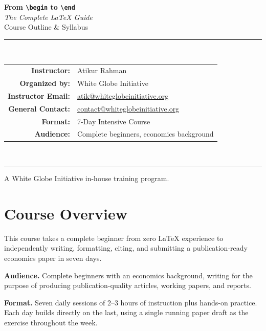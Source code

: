 \documentclass[11pt,a4paper]{article}
\begin{document}
\begin{titlepage}
  \centering
  \vspace*{2.5cm}
  {\Huge\bfseries\color{wgired} From \texttt{\textbackslash begin} to \texttt{\textbackslash end}}\\[10pt]
  {\Large\itshape The Complete LaTeX Guide}\\[6pt]
  {\large Course Outline \& Syllabus}\\[40pt]

  \rule{0.6\textwidth}{0.5pt}\\[20pt]

  \begin{tabular}{rl}
    \textbf{Instructor:}       & Atikur Rahman \\[4pt]
    \textbf{Organized by:}     & White Globe Initiative \\[4pt]
    \textbf{Instructor Email:} & \url{atik@whiteglobeinitiative.org} \\[4pt]
    \textbf{General Contact:}  & \url{contact@whiteglobeinitiative.org} \\[4pt]
    \textbf{Format:}           & 7-Day Intensive Course \\[4pt]
    \textbf{Audience:}         & Complete beginners, economics background \\
  \end{tabular}\\[20pt]

  \rule{0.6\textwidth}{0.5pt}

  \vfill
  {\small A White Globe Initiative in-house training program.}
\end{titlepage}

\tableofcontents
\newpage

\section{Course Overview}

This course takes a complete beginner from zero LaTeX experience to
independently writing, formatting, citing, and submitting a
publication-ready economics paper in seven days.

\textbf{Audience.} Complete beginners with an economics background,
writing for the purpose of producing publication-quality articles,
working papers, and reports.

\textbf{Format.} Seven daily sessions of 2--3 hours of instruction
plus hands-on practice. Each day builds directly on the last, using a
single running paper draft as the exercise throughout the week.
\end{document}
